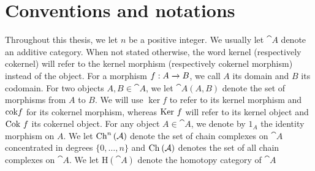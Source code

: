 \section*{Conventions and notations}\label{NOTATIONS}
Throughout this thesis, we let $n$ be a positive integer. We usually let $\cat{A}$ denote an additive category. When not stated otherwise, the word kernel (respectively cokernel) will refer to the kernel morphism (respectively cokernel morphism) instead of the object. For a morphism $f : A \xrightarrow{} B$, we call $A$ its domain and $B$ its codomain. For two objects $A, B \in \cat{A}$, we let $\cat{A}(A,B)$ denote the set of morphisms from $A$ to $B$. We will use $\ker{f}$ to refer to its kernel morphism and $\textnormal{cok}f$ for its cokernel morphism, whereas $\textnormal{Ker }f$ will refer to its kernel object and $\textnormal{Cok }f$ its cokernel object. For any object $A \in \cat{A}$, we denote by $1_A$ the identity morphism on $A$. We let $\textnormal{Ch}^{n}\left(\mathcal{A}\right)$ denote the set of chain complexes on $\cat{A}$ concentrated in degrees $\{0, \ldots, n\}$ and $\textnormal{Ch}^{}\left(\mathcal{A}\right)$ denotes the set of all chain complexes on $\cat{A}$. We let $\text{H}(\cat{A})$ denote the homotopy category of $\cat{A}$


